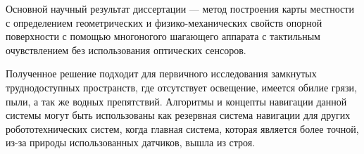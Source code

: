 
Основной  научный  результат  диссертации --- метод построения карты местности с определением геометрических и физико-механических свойств опорной поверхности с помощью многоногого шагающего аппарата с тактильным очувствлением без использования оптических сенсоров.

Полученное решение подходит для первичного исследования замкнутых труднодоступных пространств, где отсутствует освещение, имеется обилие грязи, пыли, а так же водных препятствий. Алгоритмы и концепты навигации данной системы могут быть использованы как резервная система навигации для других робототехнических систем, когда главная система, которая является более точной, из-за природы использованных датчиков, вышла из строя.


